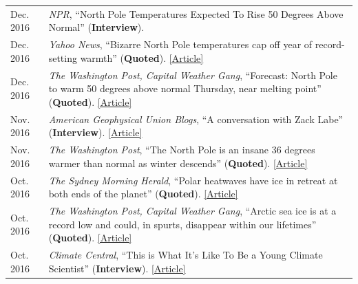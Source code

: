 \documentclass[margin,line,palatino,courier,10pt]{res}
\begin{document}
\begin{resume}
\begin{tabular}{@{}p{0.9in}p{4in}}
Dec. 2016 & \textit{NPR}, ``North Pole Temperatures Expected To Rise 50 Degrees Above Normal'' (\textbf{Interview}). \\
Dec. 2016 & \textit{Yahoo News}, ``Bizarre North Pole temperatures cap off year of record-setting warmth'' (\textbf{Quoted}). \href{https://www.yahoo.com/news/bizarre-north-pole-temperatures-cap-off-year-of-record-setting-warmth-181727978.html?soc_src=social-sh&soc_trk=tw}{[Article]}\\
Dec. 2016 & \textit{The Washington Post, Capital Weather Gang}, ``Forecast: North Pole to warm 50 degrees above normal Thursday, near melting point'' (\textbf{Quoted}). \href{https://www.washingtonpost.com/news/capital-weather-gang/wp/2016/12/20/forecast-north-pole-to-warm-50-degrees-above-normal-thursday-near-melting-point/?dfgdfgdfgdfg&utm_term=.e648369ada7e}{[Article]}\\
Nov. 2016 & \textit{American Geophysical Union Blogs}, ``A conversation with Zack Labe'' (\textbf{Interview}). \href{http://blogs.agu.org/mountainbeltway/2016/11/23/conversation-zack-labe/}{[Article]}\\
Nov. 2016 & \textit{The Washington Post}, ``The North Pole is an insane 36 degrees warmer than normal as winter descends'' (\textbf{Quoted}). \href{https://www.washingtonpost.com/news/energy-environment/wp/2016/11/17/the-north-pole-is-an-insane-36-degrees-warmer-than-normal-as-winter-descends/?utm_term=.f2cb9596b3d8}{[Article]}\\
Oct. 2016 & \textit{The Sydney Morning Herald}, ``Polar heatwaves have ice in retreat at both ends of the planet'' (\textbf{Quoted}). \href{http://www.smh.com.au/environment/climate-change/polar-heatwaves-have-ice-in-retreat-at-both-ends-of-the-planet-20161030-gse9q6.html}{[Article]}\\
Oct. 2016 & \textit{The Washington Post, Capital Weather Gang}, ``Arctic sea ice is at a record low and could, in spurts, disappear within our lifetimes'' (\textbf{Quoted}). \href{https://www.washingtonpost.com/news/capital-weather-gang/wp/2016/10/27/arctic-sea-ice-is-at-a-record-low-and-could-in-spurts-disappear-within-our-lifetimes/}{[Article]}\\
Oct. 2016 & \textit{Climate Central}, ``This is What It's Like To Be a Young Climate Scientist'' (\textbf{Interview}). \href{http://www.climatecentral.org/news/young-climate-scientists-interviews-20799}{[Article]}\\
\end{tabular}
\begin{tabular}{@{}p{0.9in}p{4in}}

\end{tabular}
\end{resume}
\end{document}
